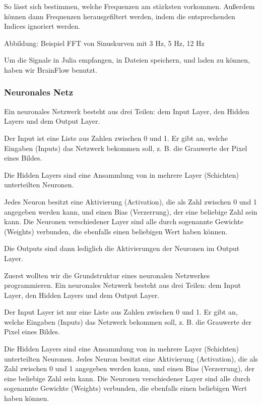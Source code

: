 \documentclass{scrartcl}
\begin{document}
	So lässt sich bestimmen, welche Frequenzen am stärksten vorkommen. Außerdem können dann Frequenzen herausgefiltert werden, indem die entsprechenden Indices ignoriert werden.

	Abbildung: Beispiel FFT von Sinuskurven mit 3 Hz, 5 Hz, 12 Hz

	Um die Signale in Julia empfangen, in Dateien speichern, und laden zu können, haben wir BrainFlow benutzt.

	\subsubsection{Neuronales Netz}

	Ein neuronales Netzwerk besteht aus drei Teilen: dem Input Layer, den Hidden Layers und dem Output Layer. 

	Der Input ist eine Liste aus Zahlen zwischen 0 und 1. Er gibt an, welche Eingaben (Inputs) das Netzwerk bekommen soll, z. B. die Grauwerte der Pixel eines Bildes.
	
	Die Hidden Layers sind eine Ansammlung von in mehrere Layer (Schichten) unterteilten Neuronen. 
	
	Jedes Neuron besitzt eine Aktivierung (Activation), die als Zahl zwischen 0 und 1 angegeben werden kann, und einen Bias (Verzerrung), der eine beliebige Zahl sein kann. Die Neuronen verschiedener Layer sind alle durch sogenannte Gewichte (Weights) verbunden, die ebenfalls einen beliebigen Wert haben können. 

	Die Outputs sind dann lediglich die Aktivierungen der Neuronen im Output Layer.
	

	Zuerst wollten wir die Grundstruktur eines neuronalen Netzwerkes programmieren. Ein neuronales Netzwerk besteht aus drei Teilen: dem Input Layer, den Hidden Layers und dem Output Layer.

	Der Input Layer ist nur eine Liste aus Zahlen zwischen 0 und 1. Er gibt an, welche Eingaben (Inputs) das Netzwerk bekommen soll, z. B. die Grauwerte der Pixel eines Bildes.

	Die Hidden Layers sind eine Ansammlung von in mehrere Layer (Schichten) unterteilten Neuronen. Jedes Neuron besitzt eine Aktivierung (Activation), die als Zahl zwischen 0 und 1 angegeben werden kann, und einen Bias (Verzerrung), der eine beliebige Zahl sein kann. Die Neuronen verschiedener Layer sind alle durch sogenannte Gewichte (Weights) verbunden, die ebenfalls einen beliebigen Wert haben können.  
\end{document}
